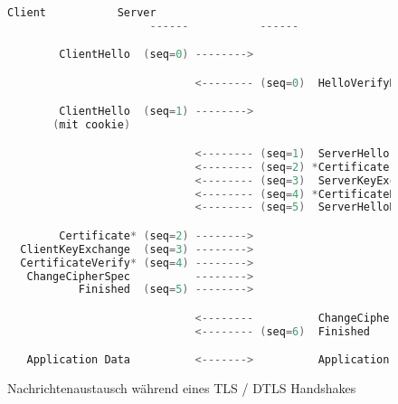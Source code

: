 \begin{figure}[ht]
  \centering
  \begin{lstlisting}[language=c]
                      Client           Server
                      ------           ------

        ClientHello  (seq=0) -------->

                             <-------- (seq=0)  HelloVerifyRequest    // Nur bei DTLS

        ClientHello  (seq=1) -------->                                // Nur bei DTLS
       (mit cookie)                                                   // Nur bei DTLS

                             <-------- (seq=1)  ServerHello
                             <-------- (seq=2) *Certificate
                             <-------- (seq=3)  ServerKeyExchange
                             <-------- (seq=4) *CertificateRequest
                             <-------- (seq=5)  ServerHelloDone

        Certificate* (seq=2) -------->
  ClientKeyExchange  (seq=3) -------->
  CertificateVerify* (seq=4) -------->
   ChangeCipherSpec          -------->
           Finished  (seq=5) -------->

                             <--------          ChangeCipherSpec
                             <-------- (seq=6)  Finished  

   Application Data          <------->          Application Data
  \end{lstlisting}
  \caption{Nachrichtenaustausch während eines TLS / DTLS Handshakes}
  \label{fig:handshake}
\end{figure}

